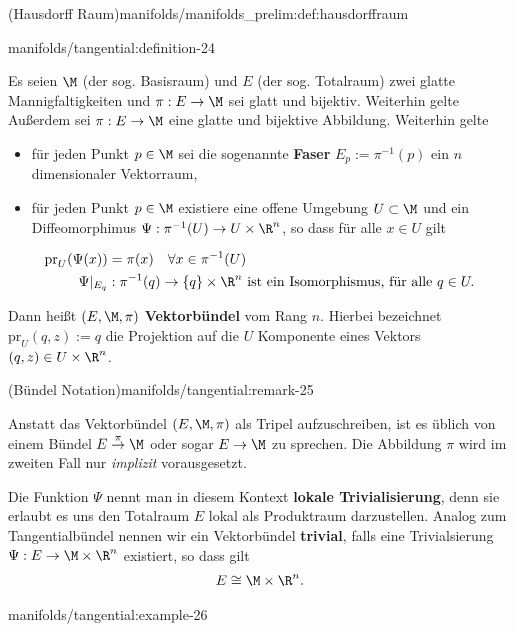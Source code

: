 \documentclass[letterpaper,10pt,english]{jupyterBook}
\begin{document}
\begin{definition}{(Hausdorff Raum)}{manifolds/manifolds_prelim:def:hausdorffraum}
\begin{definition}{}{manifolds/tangential:definition-24}
\par
Es seien \(\M\) (der sog. Basisraum) und \(E\) (der sog. Totalraum) zwei glatte Mannigfaltigkeiten und \(\pi:E\to \M\) sei glatt und bijektiv. Weiterhin gelte
Außerdem sei \(\pi:E\to \M\) eine glatte und bijektive Abbildung.
Weiterhin gelte
\begin{itemize}
\item {} 
\par
für jeden Punkt \(p\in \M\) sei die sogenannte \textbf{Faser} \(E_p:= \pi^{-1}(p)\) ein \(n\) dimensionaler Vektorraum,

\item {} 
\par
für jeden Punkt \(p\in \M\) existiere eine offene Umgebung \(U\subset \M\) und ein Diffeomorphimus \(\Psi: \pi^{-1}(U)\to U\times\R^n\), so dass für alle \(x\in U\) gilt

\end{itemize}
\begin{align*}
\text{pr}_U(\Psi(x)) &= \pi(x)\quad\forall x\in \pi^{-1}(U)\\
\Psi\rvert_{E_q}&: \pi^{-1}(q) \to \{q\}\times \R^n \text{ ist ein Isomorphismus, für alle }q\in U.
\end{align*}
\par
Dann heißt \((E,\M,\pi)\) \textbf{Vektorbündel} vom Rang \(n\).
Hierbei bezeichnet \(\text{pr}_U(q, z):= q\) die Projektion auf die \(U\) Komponente eines Vektors \((q,z)\in U\times\R^n\).
\end{definition}
\begin{remark}{(Bündel Notation)}{manifolds/tangential:remark-25}



\par
Anstatt das Vektorbündel \((E,\M,\pi)\) als Tripel aufzuschreiben, ist es üblich von einem Bündel \(E\overset{\pi}{\to}\M\) oder sogar \(E\to\M\) zu sprechen.
Die Abbildung \(\pi\) wird im zweiten Fall nur \emph{implizit} vorausgesetzt.
\end{remark}

\par
Die Funktion \(\Psi\) nennt man in diesem Kontext \textbf{lokale Trivialisierung}, denn sie erlaubt es uns den Totalraum \(E\) lokal als Produktraum darzustellen.
Analog zum Tangentialbündel nennen wir ein Vektorbündel \textbf{trivial}, falls eine Trivialsierung \(\Psi:E\to \M\times\R^n\) existiert, so dass gilt
\begin{align*}
E \cong \M\times\R^n.
\end{align*}\begin{example}{}{manifolds/tangential:example-26}




\end{example}
\end{definition}
\end{document}
